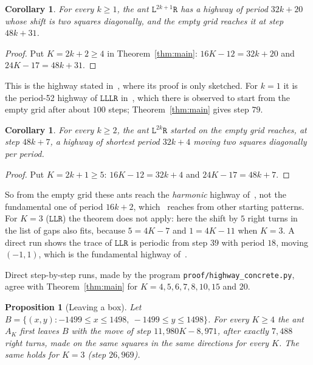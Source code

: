 \documentclass[11pt,a4paper]{article}
\newtheorem{corollary}[theorem]{Corollary}
\newtheorem{proposition}[theorem]{Proposition}
\theoremstyle{definition}
\theoremstyle{remark}
\newcommand{\Lw}{\mathtt{L}}
\newcommand{\Rw}{\mathtt{R}}
\begin{document}
\begin{corollary}\label{cor:odd}
For every $k \ge 1$, the ant $\Lw^{2k+1}\Rw$ has a highway of period $32k + 20$ whose shift is two squares
diagonally, and the empty grid reaches it at step $48k + 31$.
\end{corollary}

\begin{proof}
Put $K = 2k + 2 \ge 4$ in Theorem~\ref{thm:main}: $16K - 12 = 32k + 20$ and $24K - 17 = 48k + 31$.
\end{proof}

This is the highway stated in~\cite[Remark 3]{glr}, where its proof is only sketched. For $k = 1$ it is the
period-52 highway of $\Lw\Lw\Lw\Rw$ in~\cite{lutfalla-lllr}, which there is observed to start from the empty
grid after about $100$ steps; Theorem~\ref{thm:main} gives step $79$.

\begin{corollary}\label{cor:even}
For every $k \ge 2$, the ant $\Lw^{2k}\Rw$ started on the empty grid reaches, at step $48k + 7$, a highway
of shortest period $32k + 4$ moving two squares diagonally per period.
\end{corollary}

\begin{proof}
Put $K = 2k + 1 \ge 5$: $16K - 12 = 32k + 4$ and $24K - 17 = 48k + 7$.
\end{proof}

So from the empty grid these ants reach the \emph{harmonic} highway of~\cite[Theorem 1]{glr}, not the
fundamental one of period $16k+2$, which~\cite{glr} reaches from other starting patterns. For $K = 3$
($\Lw\Lw\Rw$) the theorem does not apply: here the shift by $5$ right turns in the list of gaps also fits,
because $5 = 4K - 7$ and $1 = 4K - 11$ when $K = 3$. A direct run shows the trace of $\Lw\Lw\Rw$ is
periodic from step $39$ with period $18$, moving $(-1,1)$, which is the fundamental highway of~\cite{glr}.

Direct step-by-step runs, made by the program \texttt{proof/highway\_concrete.py}, agree with
Theorem~\ref{thm:main} for $K = 4, 5, 6, 7, 8, 10, 15$ and $20$.

\begin{proposition}[Leaving a box]\label{prop:edge}
Let $B = \{(x,y) : -1499 \le x \le 1498,\ -1499 \le y \le 1498\}$. For every $K \ge 4$ the ant $A_K$ first
leaves $B$ with the move of step $11{,}980K - 8{,}971$, after exactly $7{,}488$ right turns, made on the same
squares in the same directions for every $K$. The same holds for $K = 3$ (step $26{,}969$).
\end{proposition}
\end{document}
